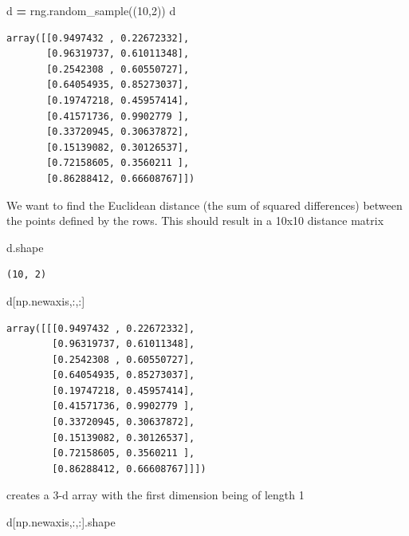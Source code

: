 \documentclass[
  letterpaper,
]{scrbook}
\newenvironment{Shaded}{\begin{snugshade}}{\end{snugshade}}
\newcommand{\DecValTok}[1]{\textcolor[rgb]{0.00,0.00,0.81}{#1}}
\newcommand{\NormalTok}[1]{#1}
\newcommand{\OperatorTok}[1]{\textcolor[rgb]{0.81,0.36,0.00}{\textbf{#1}}}
\begin{document}
\begin{Shaded}
\begin{Highlighting}[]
\NormalTok{d }\OperatorTok{=}\NormalTok{ rng.random_sample((}\DecValTok{10}\NormalTok{,}\DecValTok{2}\NormalTok{))}
\NormalTok{d}
\end{Highlighting}
\end{Shaded}

\begin{verbatim}
array([[0.9497432 , 0.22672332],
       [0.96319737, 0.61011348],
       [0.2542308 , 0.60550727],
       [0.64054935, 0.85273037],
       [0.19747218, 0.45957414],
       [0.41571736, 0.9902779 ],
       [0.33720945, 0.30637872],
       [0.15139082, 0.30126537],
       [0.72158605, 0.3560211 ],
       [0.86288412, 0.66608767]])
\end{verbatim}

We want to find the Euclidean distance (the sum of squared differences) between the points defined by the rows. This should result in a 10x10 distance matrix

\begin{Shaded}
\begin{Highlighting}[]
\NormalTok{d.shape}
\end{Highlighting}
\end{Shaded}

\begin{verbatim}
(10, 2)
\end{verbatim}

\begin{Shaded}
\begin{Highlighting}[]
\NormalTok{d[np.newaxis,:,:]}
\end{Highlighting}
\end{Shaded}

\begin{verbatim}
array([[[0.9497432 , 0.22672332],
        [0.96319737, 0.61011348],
        [0.2542308 , 0.60550727],
        [0.64054935, 0.85273037],
        [0.19747218, 0.45957414],
        [0.41571736, 0.9902779 ],
        [0.33720945, 0.30637872],
        [0.15139082, 0.30126537],
        [0.72158605, 0.3560211 ],
        [0.86288412, 0.66608767]]])
\end{verbatim}

creates a 3-d array with the first dimension being of length 1

\begin{Shaded}
\begin{Highlighting}[]
\NormalTok{d[np.newaxis,:,:].shape}
\end{Highlighting}
\end{Shaded}
\end{document}
